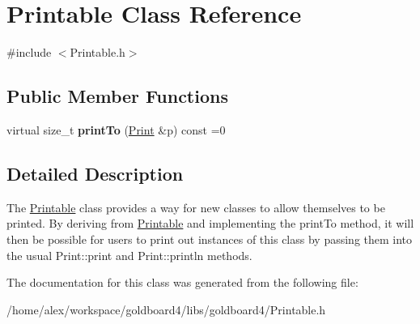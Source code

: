 \hypertarget{class_printable}{}\section{Printable Class Reference}
\label{class_printable}


{\ttfamily \#include $<$Printable.\+h$>$}

\subsection*{Public Member Functions}
\begin{DoxyCompactItemize}
\item 
virtual size\+\_\+t {\bfseries print\+To} (\hyperlink{class_print}{Print} \&p) const =0\hypertarget{class_printable_a2c5776bc55c0a3a5675bba9d4d8e3681}{}\label{class_printable_a2c5776bc55c0a3a5675bba9d4d8e3681}

\end{DoxyCompactItemize}


\subsection{Detailed Description}
The \hyperlink{class_printable}{Printable} class provides a way for new classes to allow themselves to be printed. By deriving from \hyperlink{class_printable}{Printable} and implementing the print\+To method, it will then be possible for users to print out instances of this class by passing them into the usual Print\+::print and Print\+::println methods. 

The documentation for this class was generated from the following file\+:\begin{DoxyCompactItemize}
\item 
/home/alex/workspace/goldboard4/libs/goldboard4/Printable.\+h\end{DoxyCompactItemize}
